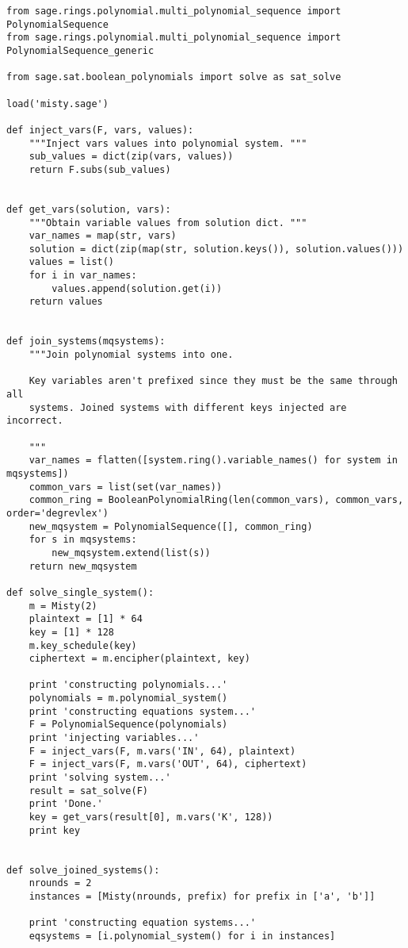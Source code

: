 \begin{lstlisting}
from sage.rings.polynomial.multi_polynomial_sequence import PolynomialSequence
from sage.rings.polynomial.multi_polynomial_sequence import PolynomialSequence_generic

from sage.sat.boolean_polynomials import solve as sat_solve

load('misty.sage')

def inject_vars(F, vars, values):
    """Inject vars values into polynomial system. """
    sub_values = dict(zip(vars, values))
    return F.subs(sub_values)


def get_vars(solution, vars):
    """Obtain variable values from solution dict. """
    var_names = map(str, vars)
    solution = dict(zip(map(str, solution.keys()), solution.values()))
    values = list()
    for i in var_names:
        values.append(solution.get(i))
    return values


def join_systems(mqsystems):
    """Join polynomial systems into one.

    Key variables aren't prefixed since they must be the same through all
    systems. Joined systems with different keys injected are incorrect.

    """
    var_names = flatten([system.ring().variable_names() for system in mqsystems])
    common_vars = list(set(var_names))
    common_ring = BooleanPolynomialRing(len(common_vars), common_vars, order='degrevlex')
    new_mqsystem = PolynomialSequence([], common_ring)
    for s in mqsystems:
        new_mqsystem.extend(list(s))
    return new_mqsystem

def solve_single_system():
    m = Misty(2)
    plaintext = [1] * 64
    key = [1] * 128
    m.key_schedule(key)
    ciphertext = m.encipher(plaintext, key)

    print 'constructing polynomials...'
    polynomials = m.polynomial_system()
    print 'constructing equations system...'
    F = PolynomialSequence(polynomials)
    print 'injecting variables...'
    F = inject_vars(F, m.vars('IN', 64), plaintext)
    F = inject_vars(F, m.vars('OUT', 64), ciphertext)
    print 'solving system...'
    result = sat_solve(F)
    print 'Done.'
    key = get_vars(result[0], m.vars('K', 128))
    print key


def solve_joined_systems():
    nrounds = 2
    instances = [Misty(nrounds, prefix) for prefix in ['a', 'b']]

    print 'constructing equation systems...'
    eqsystems = [i.polynomial_system() for i in instances]


\end{lstlisting}
